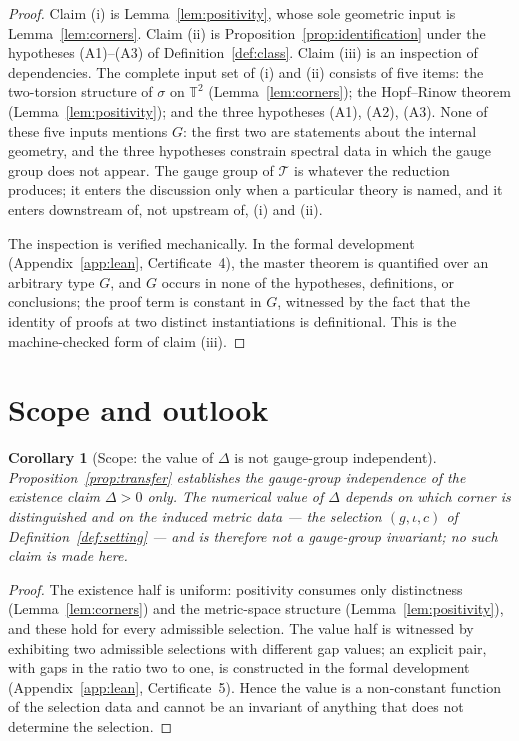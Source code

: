 \documentclass[11pt,a4paper]{article}
\newcommand{\T}{\mathbb{T}}
\newcommand{\thy}{\mathcal{T}}
\theoremstyle{plain}
\newtheorem{corollary}[theorem]{Corollary}
\theoremstyle{definition}
\theoremstyle{remark}
\begin{document}
\begin{proof}
Claim (i) is Lemma~\ref{lem:positivity}, whose sole geometric input
is Lemma~\ref{lem:corners}. Claim (ii) is
Proposition~\ref{prop:identification} under the hypotheses
(A1)--(A3) of Definition~\ref{def:class}. Claim (iii) is an
inspection of dependencies. The complete input set of (i) and (ii)
consists of five items: the two-torsion structure of $\sigma$ on
$\T^2$ (Lemma~\ref{lem:corners}); the Hopf--Rinow theorem
(Lemma~\ref{lem:positivity}); and the three hypotheses (A1), (A2),
(A3). None of these five inputs mentions $G$: the first two are
statements about the internal geometry, and the three hypotheses
constrain spectral data in which the gauge group does not appear.
The gauge group of $\thy$ is whatever the reduction produces; it
enters the discussion only when a particular theory is named, and it
enters downstream of, not upstream of, (i) and (ii).

The inspection is verified mechanically. In the formal development
(Appendix~\ref{app:lean}, Certificate~4), the master theorem is
quantified over an arbitrary type $G$, and $G$ occurs in none of the
hypotheses, definitions, or conclusions; the proof term is constant
in $G$, witnessed by the fact that the identity of proofs at two
distinct instantiations is definitional. This is the machine-checked
form of claim (iii).
\end{proof}

\section{Scope and outlook}\label{sec:scope}

\begin{corollary}[Scope: the value of $\Delta$ is not gauge-group
independent]\label{cor:scope}
Proposition~\ref{prop:transfer} establishes the gauge-group
independence of the existence claim $\Delta > 0$ only. The numerical
value of $\Delta$ depends on which corner is distinguished and on the
induced metric data --- the selection $(g, \iota, c)$ of
Definition~\ref{def:setting} --- and is therefore not a gauge-group
invariant; no such claim is made here.
\end{corollary}

\begin{proof}
The existence half is uniform: positivity consumes only distinctness
(Lemma~\ref{lem:corners}) and the metric-space structure
(Lemma~\ref{lem:positivity}), and these hold for every admissible
selection. The value half is witnessed by exhibiting two admissible
selections with different gap values; an explicit pair, with gaps in
the ratio two to one, is constructed in the formal development
(Appendix~\ref{app:lean}, Certificate~5). Hence the value is a
non-constant function of the selection data and cannot be an
invariant of anything that does not determine the selection.
\end{proof}
\end{document}
